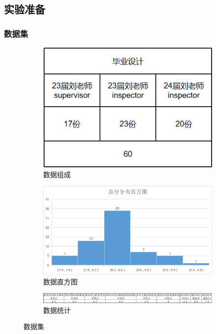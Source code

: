 \documentclass{article}
\begin{document}
\subsection{实验准备}

\subsubsection{数据集}

\begin{figure}[h!]
	\centering
	\begin{subfigure}{0.45\linewidth}
		\centering
		\includegraphics[width=0.9\linewidth]{img/data-consistent.png}
		\caption{数据组成}
		\label{fig:data-consistent}
	\end{subfigure}
	\centering
	\begin{subfigure}{0.45\linewidth}
		\centering
		\includegraphics[width=0.9\linewidth]{img/data-graph.png}
		\caption{数据直方图}
		\label{fig:data-graph}
	\end{subfigure}
    \centering
	\begin{subfigure}{0.9\linewidth}
		\centering
		\includegraphics[width=0.9\linewidth]{img/data-average.png}
		\caption{数据统计}
		\label{fig:data-average}
	\end{subfigure}
	\caption{数据集}
		\label{fig:dataset}
\end{figure}
\end{document}
